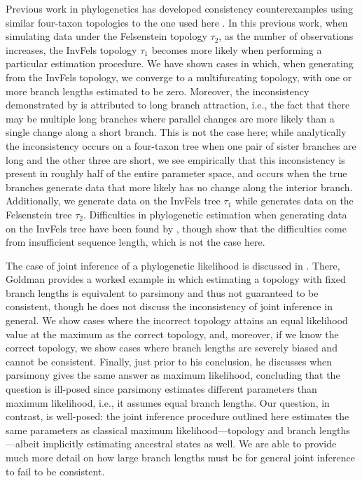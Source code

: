 \documentclass[11pt]{article}
\begin{document}
Previous work in phylogenetics has developed consistency counterexamples using similar four-taxon topologies to the one used here \citep{Felsenstein1978-rr}.
In this previous work, when simulating data under the Felsenstein topology $\tau_2$, as the number of observations increases, the InvFels topology $\tau_1$ becomes more likely when performing a particular estimation procedure.
We have shown cases in which, when generating from the InvFels topology, we converge to a multifurcating topology, with one or more branch lengths estimated to be zero.
Moreover, the inconsistency demonstrated by \citet{Felsenstein1978-rr} is attributed to long branch attraction, i.e., the fact that there may be multiple long branches where parallel changes are more likely than a single change along a short branch.
This is not the case here; while analytically the inconsistency occurs on a four-taxon tree when one pair of sister branches are long and the other three are short, we see empirically that this inconsistency is present in roughly half of the entire parameter space, and occurs when the true branches generate data that more likely has no change along the interior branch.
Additionally, we generate data on the InvFels tree $\tau_1$ while \citet{Felsenstein1978-rr} generates data on the Felsenstein tree $\tau_2$.
Difficulties in phylogenetic estimation when generating data on the InvFels tree have been found by \citet{Siddall1998-hq}, though \citet{Swofford2001-hr} show that the difficulties come from insufficient sequence length, which is not the case here.

The case of joint inference of a phylogenetic likelihood is discussed in \citet{Goldman1990-dk}.
There, Goldman provides a worked example in which estimating a topology with fixed branch lengths is equivalent to parsimony and thus not guaranteed to be consistent, though he does not discuss the inconsistency of joint inference in general.
We show cases where the incorrect topology attains an equal likelihood value at the maximum as the correct topology, and, moreover, if we know the correct topology, we show cases where branch lengths are severely biased and cannot be consistent.
Finally, just prior to his conclusion, he discusses when parsimony gives the same answer as maximum likelihood, concluding that the question is ill-posed since parsimony estimates different parameters than maximum likelihood, i.e., it assumes equal branch lengths.
Our question, in contrast, is well-posed: the joint inference procedure outlined here estimates the same parameters as classical maximum likelihood---topology and branch lengths---albeit implicitly estimating ancestral states as well.
We are able to provide much more detail on how large branch lengths must be for general joint inference to fail to be consistent.
\end{document}
